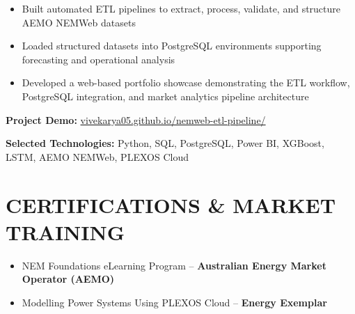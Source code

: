 \documentclass[10pt,a4paper]{article}
\begin{document}
\begin{tcolorbox}[
colback=SoftBg,
colframe=SoftLine,
arc=3pt,
boxrule=0.5pt,
left=10pt,
right=10pt,
top=8pt,
bottom=8pt
]
\begin{itemize}
\item Built automated ETL pipelines to extract, process, validate, and structure AEMO NEMWeb datasets
\item Loaded structured datasets into PostgreSQL environments supporting forecasting and operational analysis
\item Developed a web-based portfolio showcase demonstrating the ETL workflow, PostgreSQL integration, and market analytics pipeline architecture
\end{itemize}

\vspace{2pt}

\textbf{\color{Primary} Project Demo:}
\href{https://vivekarya05.github.io/nemweb-etl-pipeline/}
{\color{Secondary} vivekarya05.github.io/nemweb-etl-pipeline/}

\end{tcolorbox}


\begin{tcolorbox}[
colback=Primary,
colframe=Primary,
arc=3pt,
boxrule=0pt,
left=10pt,
right=10pt,
top=7pt,
bottom=7pt
]

\textbf{\color{white} Selected Technologies:}
\color{white}
Python, SQL, PostgreSQL, Power BI, XGBoost, LSTM, AEMO NEMWeb, PLEXOS Cloud

\end{tcolorbox}


\section{CERTIFICATIONS \& MARKET TRAINING}

\begin{itemize}
\item NEM Foundations eLearning Program -- \textbf{Australian Energy Market Operator (AEMO)}
\item Modelling Power Systems Using PLEXOS Cloud -- \textbf{Energy Exemplar}
\end{itemize}

\end{document}

